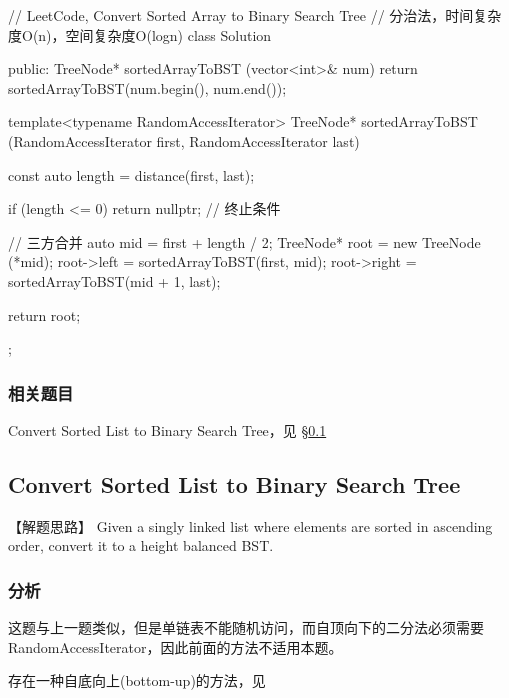 \begin{Code}
	// LeetCode, Convert Sorted Array to Binary Search Tree
	// 分治法，时间复杂度O(n)，空间复杂度O(logn)
	class Solution {
		public:
		TreeNode* sortedArrayToBST (vector<int>& num) {
			return sortedArrayToBST(num.begin(), num.end());
		}
		
		template<typename RandomAccessIterator>
		TreeNode* sortedArrayToBST (RandomAccessIterator first,
		RandomAccessIterator last) {
			const auto length = distance(first, last);
			
			if (length <= 0) return nullptr;  // 终止条件
			
			// 三方合并
			auto mid = first + length / 2;
			TreeNode* root = new TreeNode (*mid);
			root->left = sortedArrayToBST(first, mid);
			root->right = sortedArrayToBST(mid + 1, last);
			
			return root;
		}
	};
\end{Code}


\subsubsection{相关题目}
\begindot
\item Convert Sorted List to Binary Search Tree，见 \S \ref{sec:convert-sorted-list-to-binary-search-tree}
\myenddot


\subsection{Convert Sorted List to Binary Search Tree}
\label{sec:convert-sorted-list-to-binary-search-tree}


【解题思路】
Given a singly linked list where elements are sorted in ascending order, convert it to a height balanced BST.


\subsubsection{分析}
这题与上一题类似，但是单链表不能随机访问，而自顶向下的二分法必须需要RandomAccessIterator，因此前面的方法不适用本题。

存在一种自底向上(bottom-up)的方法，见


